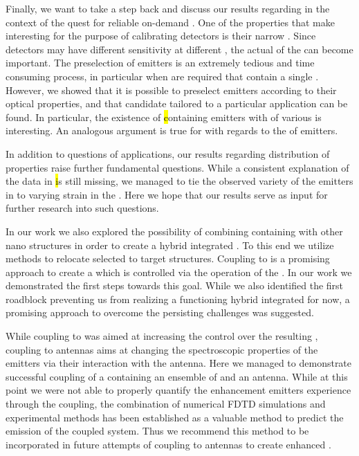 
   Finally, we want to take a step back and discuss our results regarding \sivs in the context of the quest for reliable on-demand \spss. One of the properties that make \sivs interesting \spss for the purpose of calibrating detectors is their narrow \lw \zpl. Since detectors may have different sensitivity at different \wls, the actual \wl of the \zpl can become important. 
   The preselection of emitters is an extremely tedious and time consuming process, in particular when \nds are required that contain a single \siv. However, we showed that it is possible to preselect emitters according to their optical properties, and that candidate \nds tailored to a particular application can be found. In particular, the existence of \hl containing emitters with \zpls of various \wls is interesting. An analogous argument is true for \vl with regards to the \cwl of emitters.

   In addition to questions of applications, our results regarding distribution of \siv properties raise further fundamental questions. While a consistent explanation of the data in \hl is still missing, we managed to tie the observed variety of the emitters in \vl to varying strain in the \nds. Here we hope that our results serve as input for further research into such questions.

   In our work we also explored the possibility of combining \nds containing \sivs with other nano structures in order to create a hybrid integrated \sps. To this end we utilize \pp methods to relocate selected \nds to target structures. Coupling \nds to \VCSELs is a promising approach to create a \sps which is controlled via the operation of the \VCSELs. In our work we demonstrated the first steps towards this goal. While we also identified the first roadblock preventing us from realizing a functioning hybrid integrated \sps for now, a promising approach to overcome the persisting challenges was suggested.

   While coupling \sivs to \VCSELs was aimed at increasing the control over the resulting \sps, coupling to antennas aims at changing the spectroscopic properties of the emitters via their interaction with the antenna. Here we managed to demonstrate successful coupling of a \nd containing an ensemble of \sivs and an antenna. While at this point we were not able to properly quantify the enhancement emitters experience through the coupling, the combination of numerical FDTD simulations and experimental methods has been established as a valuable method to predict the emission of the coupled system. Thus we recommend this method to be incorporated in future attempts of coupling \sivs to antennas to create enhanced \spss.

